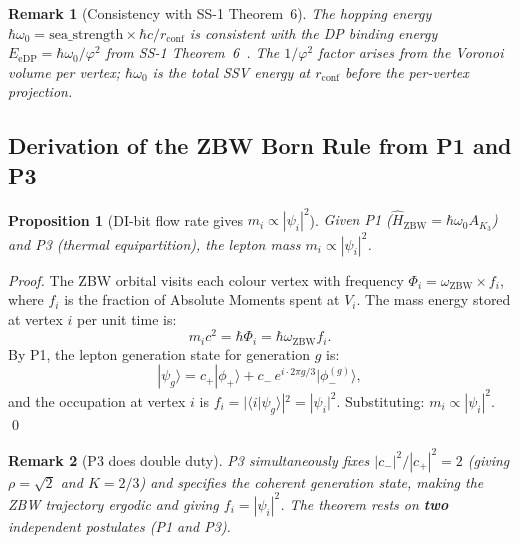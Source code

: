 \documentclass[11pt]{article}
\newtheorem{remark}{Remark}[section]
\newtheorem{proposition}[theorem]{Proposition}
\newcommand{\ZBW}{\mathrm{ZBW}}
\begin{document}
\begin{remark}[Consistency with SS-1 Theorem~6]
The hopping energy $\hbar\omega_0 = \mathrm{sea\_strength}\times\hbar c/r_{\mathrm{conf}}$
is consistent with the DP binding energy $E_{\mathrm{eDP}} = \hbar\omega_0/\varphi^2$
from SS-1 Theorem~6~\cite{abshier_ss1}.  The $1/\varphi^2$ factor arises
from the Voronoi volume per vertex; $\hbar\omega_0$ is the total SSV energy
at $r_{\mathrm{conf}}$ before the per-vertex projection.
\end{remark}

\subsection*{Derivation of the ZBW Born Rule from P1 and P3}
\label{prop:Born_derivation}

\begin{proposition}[DI-bit flow rate gives $m_i \propto |\psi_i|^2$]
Given P1 ($\hat{H}_\ZBW = \hbar\omega_0 A_{K_3}$) and P3 (thermal
equipartition), the lepton mass $m_i \propto |\psi_i|^2$.
\end{proposition}

\begin{proof}
The ZBW orbital visits each colour vertex with frequency
$\Phi_i = \omega_{\ZBW} \times f_i$, where $f_i$ is the fraction of
Absolute Moments spent at $V_i$.  The mass energy stored at vertex $i$
per unit time is:
\begin{equation}
m_i c^2 = \hbar \Phi_i = \hbar\omega_{\ZBW} f_i.
\label{eq:mass_rate}
\end{equation}
By P1, the lepton generation state for generation $g$ is:
\begin{equation}
|\psi_g\rangle = c_+|\phi_+\rangle
+ c_-\, e^{i\cdot 2\pi g/3}|\phi_-^{(g)}\rangle,
\end{equation}
and the occupation at vertex $i$ is $f_i = |\langle i|\psi_g\rangle|^2 = |\psi_i|^2$.
Substituting: $m_i \propto |\psi_i|^2$. \qed
\end{proof}

\begin{remark}[P3 does double duty]
P3 simultaneously fixes $|c_-|^2/|c_+|^2 = 2$ (giving $\rho = \sqrt{2}$
and $K = 2/3$) and specifies the coherent generation state, making the
ZBW trajectory ergodic and giving $f_i = |\psi_i|^2$.
The theorem rests on \textbf{two} independent postulates (P1 and P3).
\end{remark}
\end{document}
